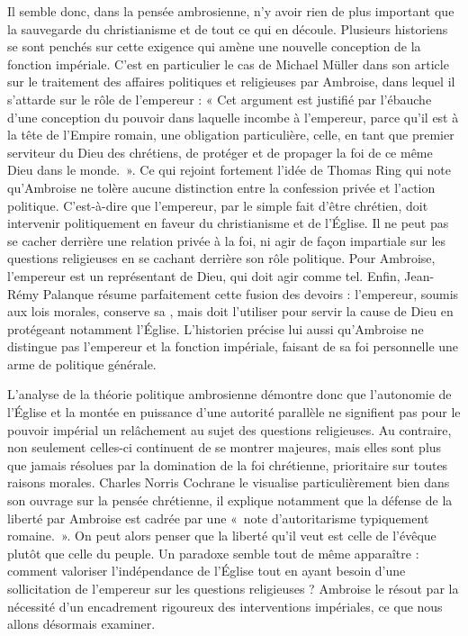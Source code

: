 Il semble donc, dans la pensée ambrosienne, n'y avoir rien de plus important que la sauvegarde du christianisme et de tout ce qui en découle. Plusieurs historiens se sont penchés sur cette exigence qui amène une nouvelle conception de la fonction impériale. C'est en particulier le cas de Michael Müller dans son article sur le traitement des affaires politiques et religieuses par Ambroise, dans lequel il s'attarde sur le rôle de l'empereur : « Cet argument est justifié par l’ébauche d'une conception du pouvoir dans laquelle incombe à l’empereur, parce qu’il est à la tête de l’Empire romain, une obligation particulière, celle, en tant que premier serviteur du Dieu des chrétiens, de protéger et de propager la foi de ce même Dieu dans le monde\autocite{muller_conflits}.~». Ce qui rejoint fortement l'idée de Thomas Ring qui note qu'Ambroise ne tolère aucune distinction entre la confession privée et l'action politique\autocite[124]{ring_auctoritas}. C'est-à-dire que l'empereur, par le simple fait d'être chrétien, doit intervenir politiquement en faveur du christianisme et de l'Église. Il ne peut pas se cacher derrière une relation privée à la foi, ni agir de façon impartiale sur les questions religieuses en se cachant derrière son rôle politique. Pour Ambroise, l'empereur est un représentant de Dieu, qui doit agir comme tel. Enfin, Jean-Rémy Palanque résume parfaitement cette fusion des devoirs : l'empereur, soumis aux lois morales, conserve sa , mais doit l'utiliser pour servir la cause de Dieu en protégeant notamment l'Église. L'historien précise lui aussi qu'Ambroise ne distingue pas l'empereur et la fonction impériale, faisant de sa foi personnelle une arme de politique générale\autocite[355]{palanque_ambroise}.

\bigskip

L'analyse de la théorie politique ambrosienne démontre donc que l'autonomie de l'Église et la montée en puissance d'une autorité parallèle ne signifient pas pour le pouvoir impérial un relâchement au sujet des questions religieuses. Au contraire, non seulement celles-ci continuent de se montrer majeures, mais elles sont plus que jamais résolues par la domination de la foi chrétienne, prioritaire sur toutes raisons morales. Charles Norris Cochrane le visualise particulièrement bien dans son ouvrage sur la pensée chrétienne, il explique notamment que la défense de la liberté par Ambroise est cadrée par une «~note d'autoritarisme typiquement romaine\autocite[355]{cochrane_christianity}.~». On peut alors penser que la liberté qu'il veut est celle de l'évêque plutôt que celle du peuple. Un paradoxe semble tout de même apparaître : comment valoriser l'indépendance de l'Église tout en ayant besoin d'une sollicitation de l'empereur sur les questions religieuses ? Ambroise le résout par la nécessité d'un encadrement rigoureux des interventions impériales, ce que nous allons désormais examiner.

